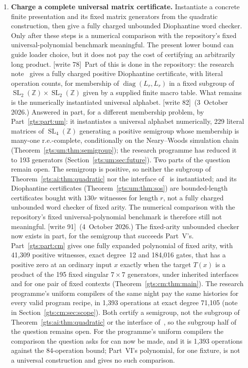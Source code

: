 \documentclass[11pt,letterpaper]{article}
\theoremstyle{definition}
\theoremstyle{remark}
\newcommand{\Z}{\mathbb Z}
\newcommand{\SL}{\operatorname{SL}}
\newcommand{\diag}{\operatorname{diag}}
\newcommand{\wtagb}{\textup{[write 78]}}
\newcommand{\wtagc}{\textup{[write 82]}}
\newcommand{\wtagd}{\textup{[write 91]}}
\begin{document}
\begin{enumerate}[label=\textbf{\arabic*.},leftmargin=*]
\item \textbf{Charge a complete universal matrix certificate.}
Instantiate a concrete finite presentation and its fixed matrix generators from the quadratic construction, then give a fully charged unbounded Diophantine word checker. Only after these steps is a numerical comparison with the repository's fixed universal-polynomial benchmark meaningful. The present lower bound can guide loader choice, but it does not pay the cost of certifying an arbitrarily long product.
\wtagb\ Part of this is done in the repository: the research note~\cite{repo-cmc} gives a fully charged positive Diophantine certificate, with literal operation counts, for membership of $\diag(L_r,L_r)$ in a fixed subgroup of $\SL_2(\Z)\times\SL_2(\Z)$ given by a supplied finite macro table. What remains is the numerically instantiated universal alphabet.
\wtagc\ (3~October 2026.) Answered in part, for a different membership problem, by Part~\ref{gts:part:um}: it instantiates a universal alphabet numerically, 229 literal matrices of $\SL_4(\Z)$ generating a positive semigroup whose membership is many-one r.e.-complete, conditionally on the Neary--Woods simulation chain (Theorem~\ref{gts:um:thm:semigroup}); the research programme has reduced it to 193 generators (Section~\ref{gts:um:sec:future}). Two parts of the question remain open. The semigroup is positive, so neither the subgroup of Theorem~\ref{gts:ai:thm:quadratic} nor the interface of~\cite{repo-cmc} is instantiated; and its Diophantine certificates (Theorem~\ref{gts:um:thm:sos}) are bounded-length certificates bought with $130r$ witnesses for length $r$, not a fully charged unbounded word checker of fixed arity. The numerical comparison with the repository's fixed universal-polynomial benchmark is therefore still not meaningful.
\wtagd\ (4~October 2026.) The fixed-arity unbounded checker now exists in part, for the semigroup that succeeds Part~V's. Part~\ref{gts:part:cm} gives one fully expanded polynomial of fixed arity, with 41,309 positive witnesses, exact degree~12 and 184,016 gates, that has a positive zero at an ordinary input $x$ exactly when the target $T(x)$ is a product of the 195 fixed singular $7\times7$ generators, under inherited interfaces and for one pair of fixed contexts (Theorem~\ref{gts:cm:thm:main}). The research programme's uniform compilers of the same night pay the same histories for every valid program recipe, in 1,393 operations at exact degree 71,105 (note in Section~\ref{gts:cm:sec:scope}). Both certify a semigroup, not the subgroup of Theorem~\ref{gts:ai:thm:quadratic} or the interface of~\cite{repo-cmc}, so the subgroup half of the question remains open. For the programme's uniform compilers the comparison the question asks for can now be made, and it is 1,393 operations against the 84-operation bound; Part~VI's polynomial, for one fixture, is not a universal construction and gives no such comparison.
\end{enumerate}
\end{document}
